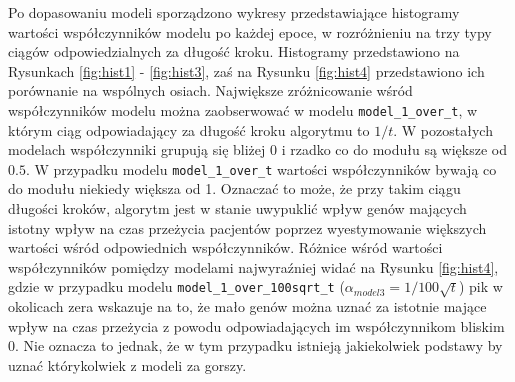 \begin{Shaded}
\begin{Highlighting}[]
\NormalTok{coxData_split[}\NormalTok{:}\NormalTok{] ->}\StringTok{ }
\NormalTok{coxData_split[}\NormalTok{:}\NormalTok{] ->}\StringTok{ }
  \NormalTok{) ->}\StringTok{ }
  \NormalTok{,}
          \NormalTok{/(}\NormalTok{*}\StringTok{ }
  \NormalTok{,}
          \NormalTok{/(}\NormalTok{*}\StringTok{ }
\end{Highlighting}
\end{Shaded}


Po dopasowaniu modeli sporządzono wykresy przedstawiające histogramy wartości współczynników modelu po każdej epoce, w rozróżnieniu na trzy typy ciągów odpowiedzialnych za długość kroku. Histogramy przedstawiono na Rysunkach \ref{fig:hist1} - \ref{fig:hist3}, zaś na Rysunku \ref{fig:hist4} przedstawiono ich porównanie na wspólnych osiach. Największe zróżnicowanie wśród współczynników modelu można zaobserwować w modelu \texttt{model\_1\_over\_t}, w którym ciąg odpowiadający za długość kroku algorytmu to $1/t$. W pozostałych modelach współczynniki grupują się bliżej $0$ i rzadko co do modułu są większe od $0.5$. W przypadku modelu \texttt{model\_1\_over\_t} wartości współczynników bywają co do modułu niekiedy większa od 1. Oznaczać to może, że przy takim ciągu długości kroków, algorytm jest w stanie uwypuklić wpływ genów mających istotny wpływ na czas przeżycia pacjentów poprzez wyestymowanie większych wartości wśród odpowiednich współczynników. Różnice wśród wartości współczynników pomiędzy modelami najwyraźniej widać na Rysunku \ref{fig:hist4}, gdzie w przypadku modelu \texttt{model\_1\_over\_100sqrt\_t} ($\alpha_{model3} = 1/100\sqrt{t}$) pik w okolicach zera wskazuje na to, że mało genów można uznać za istotnie mające wpływ na czas przeżycia z powodu odpowiadających im współczynnikom bliskim $0$. Nie oznacza to jednak, że w tym przypadku istnieją jakiekolwiek podstawy by uznać którykolwiek z modeli za gorszy.


